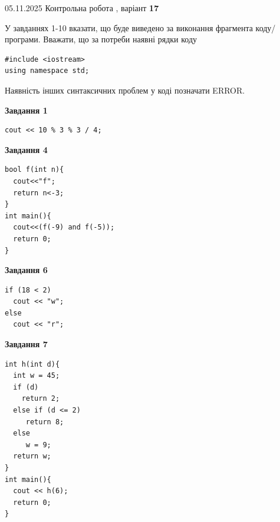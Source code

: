 \documentclass[12pt, ukrainian]{article}
\begin{document}
{\Large{05.11.2025 Контрольна робота , варіант  \No \textbf { 17 }\par}}
{
\begin {large}
У завданнях 1-10 вказати, що буде виведено за виконання фрагмента коду/про\-гра\-ми.
Вважати, що за потреби наявні рядки коду
\begin{verbatim}
#include <iostream>
using namespace std;
\end{verbatim}
Наявність інших синтаксичних проблем у коді позначати ERROR.

\begin{minipage}[t]{7.0cm}

\begin{center}
\textbf{Завдання 1}
\end{center}
\vspace{-8mm}

\begin{verbatim}
cout << 10 % 3 % 3 / 4;
\end{verbatim}



\begin{center}
\textbf{Завдання 4}
\end{center}
\vspace{-8mm}

\begin{verbatim}
bool f(int n){
  cout<<"f";
  return n<-3;
}
int main(){
  cout<<(f(-9) and f(-5));
  return 0;
}
\end{verbatim}



\begin{center}
\textbf{Завдання 6}
\end{center}
\vspace{-8mm}

\begin{verbatim}
if (18 < 2)
  cout << "w";
else
  cout << "r";
\end{verbatim}



\begin{center}
\textbf{Завдання 7}
\end{center}
\vspace{-8mm}

\begin{verbatim}
int h(int d){
  int w = 45;
  if (d)
    return 2;
  else if (d <= 2)
     return 8;
  else
     w = 9;
  return w;
}
int main(){
  cout << h(6);
  return 0;
}
\end{verbatim}


\end{minipage}
\end{large}}
\end{document}
